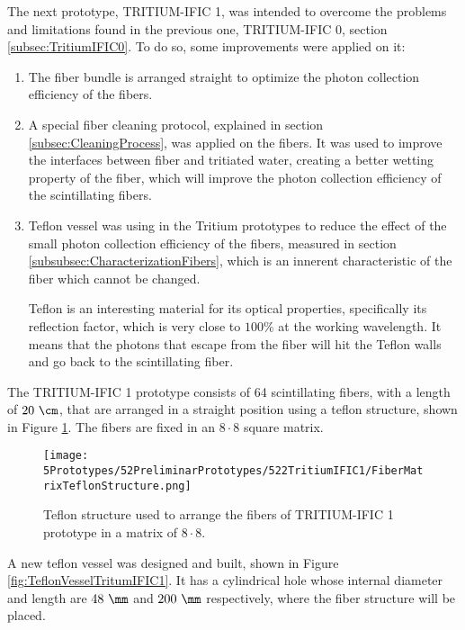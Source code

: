 The next prototype, TRITIUM-IFIC 1, was intended to overcome the problems and limitations found in the previous one, TRITIUM-IFIC 0, section \ref{subsec:TritiumIFIC0}. To do so, some improvements were applied on it:

\begin{enumerate}

\item{} The fiber bundle is arranged straight to optimize the photon collection efficiency of the fibers.

\item{} A special fiber cleaning protocol, explained in section \ref{subsec:CleaningProcess}, was applied on the fibers. It was used to improve the interfaces between fiber and tritiated water, creating a better wetting property of the fiber, which will improve the photon collection efficiency of the scintillating fibers.

\item{}  Teflon vessel was using in the Tritium prototypes to reduce the effect of the small photon collection efficiency of the fibers, measured in section \ref{subsubsec:CharacterizationFibers}, which is an innerent characteristic of the fiber which cannot be changed.

Teflon is an interesting material for its optical properties, specifically its reflection factor, which is very close to $100\%$ at the working wavelength. It means that the photons that escape from the fiber will hit the Teflon walls and go back to the scintillating fiber.

\end{enumerate}

The TRITIUM-IFIC 1 prototype consists of 64 scintillating fibers, with a length of $20~\cm$, that are arranged in a straight position using a teflon structure, shown in Figure \ref{fig:TeflonStructureFibersTritiumIFIC1}. The fibers are fixed in an $8\cdot{}8$ square matrix.

\begin{figure}[h]
\centering
\texttt{[image: 5Prototypes/52PreliminarPrototypes/522TritiumIFIC1/FiberMatrixTeflonStructure.png]}
\caption{Teflon structure used to arrange the fibers of TRITIUM-IFIC 1 prototype in a matrix of $8\cdot{}8$.\label{fig:TeflonStructureFibersTritiumIFIC1}}
\end{figure}

A new teflon vessel was designed and built, shown in Figure \ref{fig:TeflonVesselTritumIFIC1}. It has a cylindrical hole whose internal diameter and length are $48~\mm$ and $200~\mm$ respectively, where the fiber structure will be placed. 

